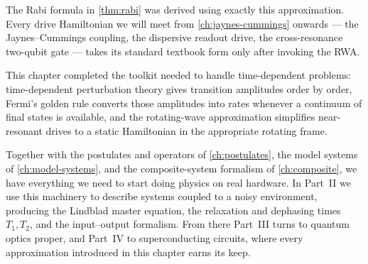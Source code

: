 \begin{example}
The Rabi formula in \cref{thm:rabi} was derived using exactly this
approximation. Every drive Hamiltonian we will meet from
\cref{ch:jaynes-cummings} onwards --- the Jaynes--Cummings coupling,
the dispersive readout drive, the cross-resonance two-qubit gate ---
takes its standard textbook form only after invoking the RWA.
\end{example}

This chapter completed the toolkit needed to handle time-dependent
problems: time-dependent perturbation theory gives transition
amplitudes order by order, Fermi's golden rule converts those
amplitudes into rates whenever a continuum of final states is
available, and the rotating-wave approximation simplifies
near-resonant drives to a static Hamiltonian in the appropriate
rotating frame.

Together with the postulates and operators of
\cref{ch:postulates}, the model systems of \cref{ch:model-systems},
and the composite-system formalism of \cref{ch:composite}, we have
everything we need to start doing physics on real hardware. In
Part~II we use this machinery to describe systems coupled to a
noisy environment, producing the Lindblad master equation, the
relaxation and dephasing times $T_1,T_2$, and the input--output
formalism. From there Part~III turns to quantum optics proper, and
Part~IV to superconducting circuits, where every approximation
introduced in this chapter earns its keep.


